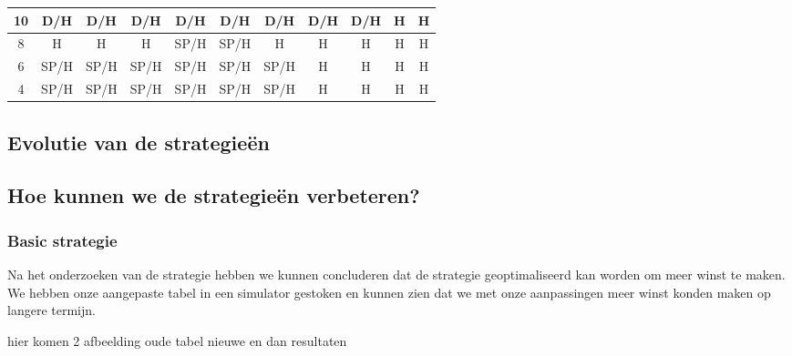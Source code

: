 \documentclass[conference]{IEEEtran}
\begin{document}
\begin{table}[h]
\begin{tabular}{|c|c|c|c|c|c|c|c|c|c|c|}
10 & \cellcolor[HTML]{F8FF00}D/H & \cellcolor[HTML]{F8FF00}D/H & \cellcolor[HTML]{F8FF00}D/H & \cellcolor[HTML]{F8FF00}D/H & \cellcolor[HTML]{F8FF00}D/H & \cellcolor[HTML]{F8FF00}D/H & \cellcolor[HTML]{F8FF00}D/H & \cellcolor[HTML]{F8FF00}D/H & \cellcolor[HTML]{FE0000}H & \cellcolor[HTML]{FE0000}H \\ \hline
8 & \cellcolor[HTML]{FE0000}H & \cellcolor[HTML]{FE0000}H & \cellcolor[HTML]{FE0000}H & \cellcolor[HTML]{FFC702}SP/H & \cellcolor[HTML]{FFC702}SP/H & \cellcolor[HTML]{FE0000}H & \cellcolor[HTML]{FE0000}H & \cellcolor[HTML]{FE0000}H & \cellcolor[HTML]{FE0000}H & \cellcolor[HTML]{FE0000}H \\ \hline
6 & \cellcolor[HTML]{FFC702}SP/H & \cellcolor[HTML]{FFC702}SP/H & \cellcolor[HTML]{FFC702}SP/H & \cellcolor[HTML]{FFC702}SP/H & \cellcolor[HTML]{FFC702}SP/H & \cellcolor[HTML]{FFC702}SP/H & \cellcolor[HTML]{FE0000}H & \cellcolor[HTML]{FE0000}H & \cellcolor[HTML]{FE0000}H & \cellcolor[HTML]{FE0000}H \\ \hline
4 & \cellcolor[HTML]{FFC702}SP/H & \cellcolor[HTML]{FFC702}SP/H & \cellcolor[HTML]{FFC702}SP/H & \cellcolor[HTML]{FFC702}SP/H & \cellcolor[HTML]{FFC702}SP/H & \cellcolor[HTML]{FFC702}SP/H & \cellcolor[HTML]{FE0000}H & \cellcolor[HTML]{FE0000}H & \cellcolor[HTML]{FE0000}H & \cellcolor[HTML]{FE0000}H \\ \hline
\end{tabular}
\end{table}





\subsection{Evolutie van de strategie\"{e}n}

\subsection{Hoe kunnen we de strategie\"{e}n verbeteren?}
\subsubsection{Basic strategie}
Na het onderzoeken van de strategie hebben we kunnen concluderen dat de strategie geoptimaliseerd kan worden om meer winst te maken.
We hebben onze aangepaste tabel in een simulator gestoken en kunnen zien dat we met onze aanpassingen meer winst konden maken op langere termijn.

hier komen 2 afbeelding oude tabel nieuwe en dan resultaten
\end{document}
